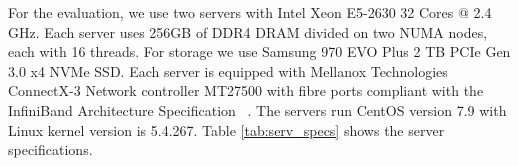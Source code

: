 For the evaluation, we use two servers with Intel Xeon E5-2630 32 Cores @ 2.4
GHz. Each server uses 256GB of DDR4 DRAM divided on two NUMA nodes, each with 16
threads. For storage we use Samsung 970 EVO Plus 2 TB PCIe Gen 3.0 x4 NVMe SSD.
Each server is equipped with Mellanox Technologies ConnectX-3 Network controller
MT27500 with fibre ports compliant with the InfiniBand Architecture
Specification ~\cite{infiniband}. The servers run CentOS version 7.9 with Linux kernel version is
5.4.267. Table \ref{tab:serv_specs} shows the server specifications.
\begin{table}[H]
\caption{Server specifications table.}
\label{tab:serv_specs}
\end{table}

